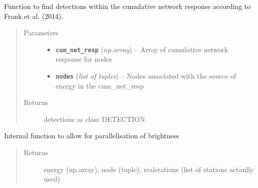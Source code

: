 \documentclass[a4paper,10pt,english]{sphinxmanual}
\begin{document}
\begin{fulllineitems}
\label{modules:bright_lights._find_detections}
Function to find detections within the cumulative network response according
to Frank et al. (2014).
\begin{quote}\begin{description}
\item[{Parameters}] \leavevmode\begin{itemize}
\item {} 
\textbf{\texttt{cum\_net\_resp}} (\emph{np.array}) -- Array of cumulative network response for nodes

\item {} 
\textbf{\texttt{nodes}} (\emph{list of tuples}) -- Nodes associated with the source of energy in the cum\_net\_resp

\end{itemize}

\item[{Returns}] \leavevmode
detections as class DETECTION

\end{description}\end{quote}

\end{fulllineitems}


\begin{fulllineitems}
\label{modules:bright_lights._node_loop}
Internal function to allow for parallelisation of brightness
\begin{quote}\begin{description}
\item[{Returns}] \leavevmode
energy (np.array), node (tuple), realstations (list of stations actaully used)

\end{description}\end{quote}

\end{fulllineitems}

\end{document}
